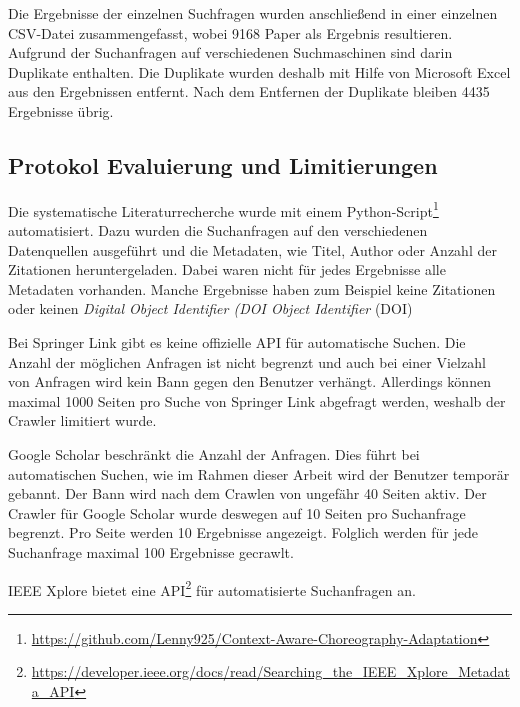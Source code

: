 \documentclass[conference,compsoc]{IEEEtran}
\begin{document}
Die Ergebnisse der einzelnen Suchfragen wurden anschließend in einer einzelnen CSV-Datei zusammengefasst, wobei 9168 Paper als Ergebnis resultieren. Aufgrund der Suchanfragen auf verschiedenen Suchmaschinen sind darin Duplikate enthalten. Die Duplikate wurden deshalb mit Hilfe von Microsoft Excel aus den Ergebnissen entfernt.
Nach dem Entfernen der Duplikate bleiben 4435 Ergebnisse übrig.

\subsection{Protokol Evaluierung und Limitierungen}
Die systematische Literaturrecherche wurde mit einem Python-Script\footnote{\url{https://github.com/Lenny925/Context-Aware-Choreography-Adaptation}} automatisiert. Dazu wurden die Suchanfragen auf den verschiedenen Datenquellen ausgeführt und die Metadaten, wie Titel, Author oder Anzahl der Zitationen heruntergeladen. Dabei waren nicht für jedes Ergebnisse alle Metadaten vorhanden. Manche Ergebnisse haben zum Beispiel keine Zitationen oder keinen \textit{Digital Object Identifier (DOI Object Identifier} (DOI)

Bei Springer Link gibt es keine offizielle API für automatische Suchen. Die Anzahl der möglichen Anfragen ist nicht begrenzt und auch bei einer Vielzahl von Anfragen wird kein Bann gegen den Benutzer verhängt. Allerdings können maximal 1000 Seiten pro Suche von Springer Link abgefragt werden, weshalb der Crawler limitiert wurde. 

Google Scholar beschränkt die Anzahl der Anfragen. Dies führt bei automatischen Suchen, wie im Rahmen dieser Arbeit wird der Benutzer temporär gebannt. Der Bann wird nach dem Crawlen von ungefähr 40 Seiten aktiv. Der Crawler für Google Scholar wurde deswegen auf 10 Seiten pro Suchanfrage begrenzt. Pro Seite werden 10 Ergebnisse angezeigt. Folglich werden für jede Suchanfrage maximal 100 Ergebnisse gecrawlt. 

IEEE Xplore bietet eine API\footnote{\url{https://developer.ieee.org/docs/read/Searching_the_IEEE_Xplore_Metadata_API}} für automatisierte Suchanfragen an.

%
%
%
%
\end{document}
